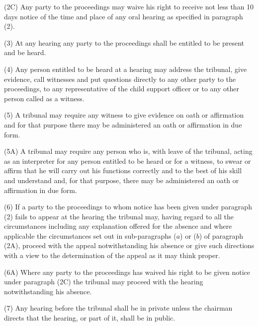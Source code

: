 \documentclass[a4paper]{article}
\begin{document}
(2C) Any party to the proceedings may waive his right to receive not less than 10 days notice of the time and place of any oral hearing as specified in paragraph (2).

(3) At any hearing any party to the proceedings shall be entitled to be present and be heard.

(4) Any person entitled to be heard at a hearing may address the tribunal, give evidence, call witnesses and put questions directly to any other party to the proceedings, to any representative of the child support officer or to any other person called as a witness.

(5) A tribunal may require any witness to give evidence on oath or affirmation and for that purpose there may be administered an oath or affirmation in due form.

(5A) A tribunal may require any person who is, with leave of the tribunal, acting as an interpreter for any person entitled to be heard or for a witness, to swear or affirm that he will carry out his functions correctly and to the best of his skill and understand and, for that purpose, there may be administered an oath or affirmation in due form.

(6) If a party to the proceedings to whom notice has been given under paragraph (2) fails to appear at the hearing the tribunal may, having regard to all the circumstances including any explanation offered for the absence
and where applicable the circumstances set out in sub-paragraphs ($a$) or ($b$) of paragraph (2A),  %
proceed with the appeal notwithstanding his absence or give such directions with a view to the determination of the appeal as it may think proper.

(6A) Where any party to the proceedings has waived his right to be given notice under paragraph (2C) the tribunal may proceed with the hearing notwithstanding his absence.

(7) Any hearing before the tribunal shall be in private unless the chairman directs that the hearing, or part of it, shall be in public.
\end{document}
